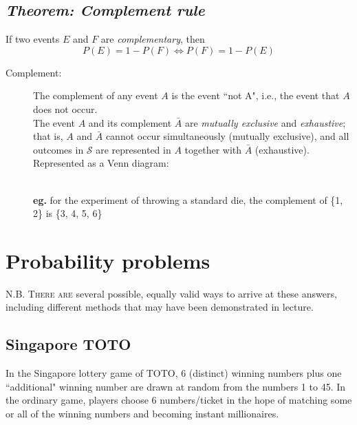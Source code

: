\documentclass{article}
\begin{document}
\subsection{\em Theorem: Complement rule}
If two events $E$ and $F$ are \textit{complementary}, then 
\begin{equation*}
P(E)=1-P(F)\Leftrightarrow P(F)=1-P(E)
\end{equation*}
\begin{description}
\item[\sc Complement:] The complement of any event $A$ is the event ``not A", i.e., the event that $A$ does not occur.\\
The event $A$ and its complement $\bar{A}$ are \textit{mutually exclusive} and \textit{exhaustive}; that is, $A$ and $\bar{A}$ cannot occur simultaneously (mutually exclusive), and all outcomes in $\mathcal{S}$ are represented in $A$ together with $\bar{A}$ (exhaustive).\\[1ex]
Represented as a Venn diagram:\\
\\
\textbf{eg.} for the experiment of throwing a standard die, the complement of \{1, 2\} is \{3, 4, 5, 6\}
\end{description}

\section{\sc Probability problems}
\textsc{N.B. There are} several possible, equally valid ways to arrive at these answers, including different methods that may have been demonstrated in lecture.

\subsection{Singapore TOTO}
In the Singapore lottery game of TOTO, 6 (distinct) winning numbers plus one ``additional" winning number are drawn at random from the numbers 1 to 45. In the ordinary game, players choose 6 numbers/ticket in the hope of matching some or all of the winning numbers and becoming instant millionaires.
\end{document}
